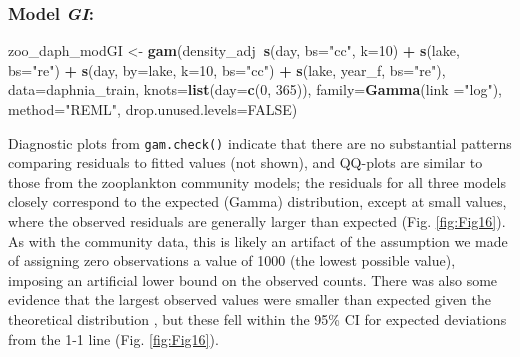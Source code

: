 \documentclass[12pt]{article}
\newenvironment{Shaded}{\begin{snugshade}}{\end{snugshade}}
\newcommand{\KeywordTok}[1]{\textcolor[rgb]{0.13,0.29,0.53}{\textbf{#1}}}
\newcommand{\DataTypeTok}[1]{\textcolor[rgb]{0.13,0.29,0.53}{#1}}
\newcommand{\DecValTok}[1]{\textcolor[rgb]{0.00,0.00,0.81}{#1}}
\newcommand{\StringTok}[1]{\textcolor[rgb]{0.31,0.60,0.02}{#1}}
\newcommand{\OtherTok}[1]{\textcolor[rgb]{0.56,0.35,0.01}{#1}}
\newcommand{\OperatorTok}[1]{\textcolor[rgb]{0.81,0.36,0.00}{\textbf{#1}}}
\newcommand{\NormalTok}[1]{#1}
\begin{document}
\subsubsection{\texorpdfstring{Model
\emph{GI}:}{Model GI:}}\label{model-gi}

\begin{Shaded}
\begin{Highlighting}[]
\NormalTok{zoo_daph_modGI <-}\StringTok{ }\KeywordTok{gam}\NormalTok{(density_adj}\OperatorTok{~}\KeywordTok{s}\NormalTok{(day, }\DataTypeTok{bs=}\StringTok{"cc"}\NormalTok{, }\DataTypeTok{k=}\DecValTok{10}\NormalTok{) }\OperatorTok{+}\StringTok{ }\KeywordTok{s}\NormalTok{(lake, }\DataTypeTok{bs=}\StringTok{"re"}\NormalTok{) }\OperatorTok{+}
\StringTok{                        }\KeywordTok{s}\NormalTok{(day, }\DataTypeTok{by=}\NormalTok{lake, }\DataTypeTok{k=}\DecValTok{10}\NormalTok{, }\DataTypeTok{bs=}\StringTok{"cc"}\NormalTok{) }\OperatorTok{+}
\StringTok{                        }\KeywordTok{s}\NormalTok{(lake, year_f, }\DataTypeTok{bs=}\StringTok{"re"}\NormalTok{),}
                      \DataTypeTok{data=}\NormalTok{daphnia_train, }\DataTypeTok{knots=}\KeywordTok{list}\NormalTok{(}\DataTypeTok{day=}\KeywordTok{c}\NormalTok{(}\DecValTok{0}\NormalTok{, }\DecValTok{365}\NormalTok{)),}
                      \DataTypeTok{family=}\KeywordTok{Gamma}\NormalTok{(}\DataTypeTok{link =}\StringTok{"log"}\NormalTok{), }\DataTypeTok{method=}\StringTok{"REML"}\NormalTok{,}
                      \DataTypeTok{drop.unused.levels=}\OtherTok{FALSE}\NormalTok{)}
\end{Highlighting}
\end{Shaded}

Diagnostic plots from \texttt{gam.check()} indicate that there are no
substantial patterns comparing residuals to fitted values (not shown),
and QQ-plots are similar to those from the zooplankton community models;
the residuals for all three models closely correspond to the expected
(Gamma) distribution, except at small values, where the observed
residuals are generally larger than expected (Fig. \ref{fig:Fig16}). As
with the community data, this is likely an artifact of the assumption we
made of assigning zero observations a value of 1000 (the lowest possible
value), imposing an artificial lower bound on the observed counts. There
was also some evidence that the largest observed values were smaller
than expected given the theoretical distribution , but these fell within
the 95\% CI for expected deviations from the 1-1 line (Fig.
\ref{fig:Fig16}).
\end{document}
